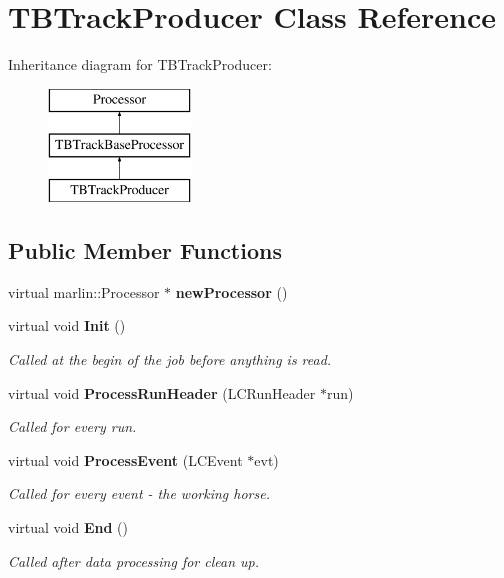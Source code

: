 \section{T\-B\-Track\-Producer Class Reference}
\label{classTBTrackProducer}
Inheritance diagram for T\-B\-Track\-Producer\-:\begin{figure}[H]
\begin{center}
\leavevmode
\includegraphics[height=3.000000cm]{classTBTrackProducer}
\end{center}
\end{figure}
\subsection*{Public Member Functions}
\begin{DoxyCompactItemize}
\item 
virtual marlin\-::\-Processor $\ast$ {\bfseries new\-Processor} ()\label{classTBTrackProducer_a5159c5af2b5661e0e0a7bfc7591217a9}

\item 
virtual void {\bf Init} ()\label{classTBTrackProducer_a261213eb92718b68b315253b056be414}

\begin{DoxyCompactList}\small\item\em Called at the begin of the job before anything is read. \end{DoxyCompactList}\item 
virtual void {\bf Process\-Run\-Header} (L\-C\-Run\-Header $\ast$run)\label{classTBTrackProducer_ac8c608a27e729c78ced0ec8b1969ca24}

\begin{DoxyCompactList}\small\item\em Called for every run. \end{DoxyCompactList}\item 
virtual void {\bf Process\-Event} (L\-C\-Event $\ast$evt)\label{classTBTrackProducer_a4aabdb65ff27029731aa3ce567ed528c}

\begin{DoxyCompactList}\small\item\em Called for every event -\/ the working horse. \end{DoxyCompactList}\item 
virtual void {\bf End} ()\label{classTBTrackProducer_a0294d07e812929d30d0797a15de7958b}

\begin{DoxyCompactList}\small\item\em Called after data processing for clean up. \end{DoxyCompactList}\end{DoxyCompactItemize}
